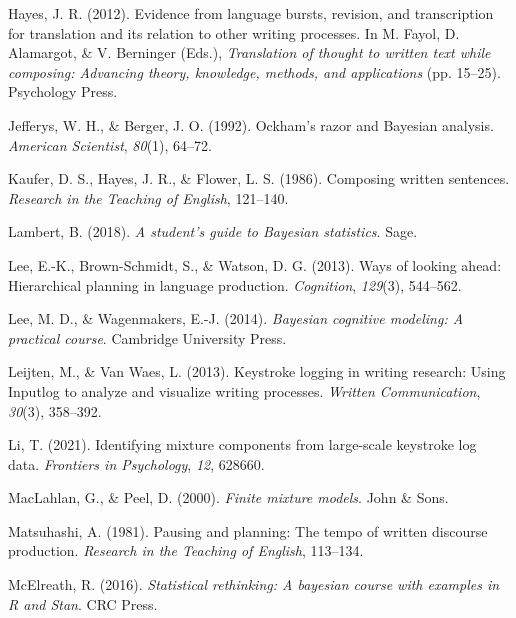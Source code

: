 \documentclass[
  man,floatsintext]{apa7}
\newlength{\cslhangindent}
\newlength{\cslentryspacingunit} %
\newenvironment{CSLReferences}[2] %
 {%
  \setlength{\parindent}{0pt}
  \ifodd #1
  \let\oldpar\par
  \def\par{\hangindent=\cslhangindent\oldpar}
  \fi
  \setlength{\parskip}{#2\cslentryspacingunit}
 }%
 {}
\begin{document}
\begin{CSLReferences}{1}{0}
\leavevmode{}%
Hayes, J. R. (2012). Evidence from language bursts, revision, and transcription for translation and its relation to other writing processes. In M. Fayol, D. Alamargot, \& V. Berninger (Eds.), \emph{Translation of thought to written text while composing: Advancing theory, knowledge, methods, and applications} (pp. 15--25). Psychology Press.

\leavevmode{}%
Jefferys, W. H., \& Berger, J. O. (1992). Ockham's razor and {B}ayesian analysis. \emph{American Scientist}, \emph{80}(1), 64--72.

\leavevmode{}%
Kaufer, D. S., Hayes, J. R., \& Flower, L. S. (1986). Composing written sentences. \emph{Research in the Teaching of English}, 121--140.

\leavevmode{}%
Lambert, B. (2018). \emph{A student's guide to {B}ayesian statistics}. Sage.

\leavevmode{}%
Lee, E.-K., Brown-Schmidt, S., \& Watson, D. G. (2013). Ways of looking ahead: Hierarchical planning in language production. \emph{Cognition}, \emph{129}(3), 544--562.

\leavevmode{}%
Lee, M. D., \& Wagenmakers, E.-J. (2014). \emph{Bayesian cognitive modeling: A practical course}. Cambridge University Press.

\leavevmode{}%
Leijten, M., \& Van Waes, L. (2013). Keystroke logging in writing research: Using {Inputlog} to analyze and visualize writing processes. \emph{Written Communication}, \emph{30}(3), 358--392.

\leavevmode{}%
Li, T. (2021). Identifying mixture components from large-scale keystroke log data. \emph{Frontiers in Psychology}, \emph{12}, 628660.

\leavevmode{}%
MacLahlan, G., \& Peel, D. (2000). \emph{Finite mixture models}. John \& Sons.

\leavevmode{}%
Matsuhashi, A. (1981). Pausing and planning: The tempo of written discourse production. \emph{Research in the Teaching of English}, 113--134.

\leavevmode{}%
McElreath, R. (2016). \emph{Statistical rethinking: {A} bayesian course with examples in {R} and {Stan}}. CRC Press.


\end{CSLReferences}
\end{document}
